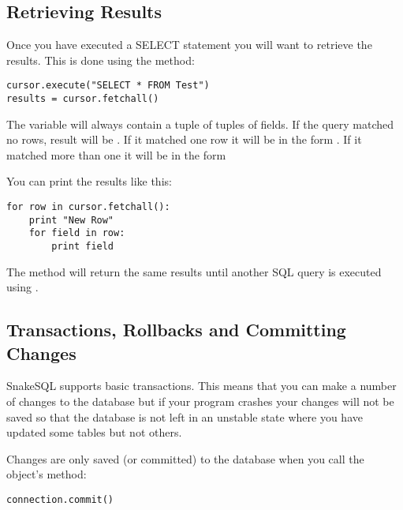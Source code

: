 \documentclass{howto}
\begin{document}
\subsection{Retrieving Results}

Once you have executed a SELECT statement you will want to retrieve the results. This is done using the  method:

\begin{verbatim}
cursor.execute("SELECT * FROM Test")
results = cursor.fetchall()
\end{verbatim}

The  variable will always contain a tuple of tuples of fields. If the query matched no rows, result will be \code{((),)}. If it matched one row it will be in the form . If it matched more than one it will be in the form 

You can print the results like this:

\begin{verbatim}
for row in cursor.fetchall():
    print "New Row"
    for field in row:
        print field
\end{verbatim}

The  method will return the same results until another SQL query is executed using .



\subsection{Transactions, Rollbacks and Committing Changes}

SnakeSQL supports basic transactions. This means that you can make a number of changes to the database but if your program crashes your changes will not be saved so that the database is not left in an unstable state where you have updated some tables but not others.

Changes are only saved (or committed) to the database when you call the  object's  method:

\begin{verbatim}
connection.commit()
\end{verbatim}
\end{document}
